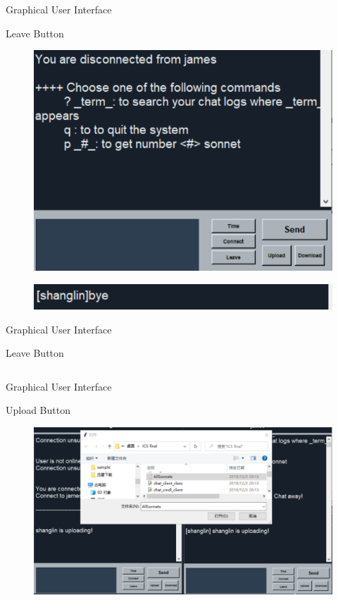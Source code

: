 \documentclass[a4paper,10pt]{beamer}
\begin{document}
\begin{frame}{Graphical User Interface}
\begin{block}{Leave Button}
\begin{figure}
    \centering
    \includegraphics[width=0.7\linewidth]{bye1.png}
\end{figure}
\begin{figure}
    \centering
    \includegraphics[width=0.7\linewidth]{bye2.png}
\end{figure}
\end{block}
\end{frame}

\begin{frame}{Graphical User Interface}
\begin{block}{Leave Button}
\inputminted[linenos]{python}{quit.py}
\end{block}
\end{frame}

\begin{frame}{Graphical User Interface}
\begin{block}{Upload Button}
\begin{figure}
    \centering
    \includegraphics[width=\linewidth]{upload.png}
\end{figure}
\end{block}
\end{frame}
\end{document}
